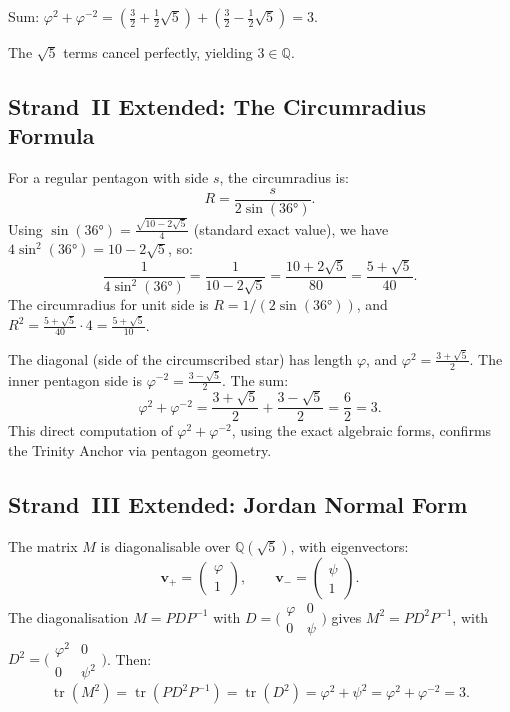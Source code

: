 Sum: $\varphi^{2}+\varphi^{-2} = (\tfrac{3}{2}+\tfrac{1}{2}\sqrt{5})
+ (\tfrac{3}{2}-\tfrac{1}{2}\sqrt{5}) = 3$.

The $\sqrt{5}$ terms cancel perfectly, yielding $3 \in \mathbb{Q}$.

\subsection{Strand~II Extended: The Circumradius Formula}

For a regular pentagon with side $s$, the circumradius is:
\[
  R = \frac{s}{2\sin(36°)}.
\]
Using $\sin(36°) = \tfrac{\sqrt{10-2\sqrt{5}}}{4}$
(standard exact value), we have $4\sin^{2}(36°) = 10-2\sqrt{5}$,
so:
\[
  \frac{1}{4\sin^{2}(36°)} = \frac{1}{10-2\sqrt{5}} = \frac{10+2\sqrt{5}}{80} = \frac{5+\sqrt{5}}{40}.
\]
The circumradius for unit side is $R = 1/(2\sin(36°))$,
and $R^{2} = \tfrac{5+\sqrt{5}}{40} \cdot 4 = \tfrac{5+\sqrt{5}}{10}$.

The diagonal (side of the circumscribed star) has length $\varphi$,
and $\varphi^{2} = \tfrac{3+\sqrt{5}}{2}$.
The inner pentagon side is $\varphi^{-2} = \tfrac{3-\sqrt{5}}{2}$.
The sum:
\[
  \varphi^{2}+\varphi^{-2} = \frac{3+\sqrt{5}}{2} + \frac{3-\sqrt{5}}{2}
  = \frac{6}{2} = 3.
\]
This direct computation of $\varphi^{2}+\varphi^{-2}$, using
the exact algebraic forms, confirms the Trinity Anchor via
pentagon geometry.

\subsection{Strand~III Extended: Jordan Normal Form}

The matrix $M$ is diagonalisable over $\mathbb{Q}(\sqrt{5})$,
with eigenvectors:
\[
  \mathbf{v}_{+} = \begin{pmatrix}\varphi\\1\end{pmatrix},\qquad
  \mathbf{v}_{-} = \begin{pmatrix}\psi\\1\end{pmatrix}.
\]
The diagonalisation $M = PDP^{-1}$ with
$D = \bigl(\begin{smallmatrix}\varphi&0\\0&\psi\end{smallmatrix}\bigr)$
gives $M^{2} = PD^{2}P^{-1}$, with
$D^{2} = \bigl(\begin{smallmatrix}\varphi^{2}&0\\0&\psi^{2}\end{smallmatrix}\bigr)$.
Then:
\[
  \operatorname{tr}(M^{2})
  = \operatorname{tr}(PD^{2}P^{-1})
  = \operatorname{tr}(D^{2})
  = \varphi^{2}+\psi^{2}
  = \varphi^{2}+\varphi^{-2}
  = 3.
\]

